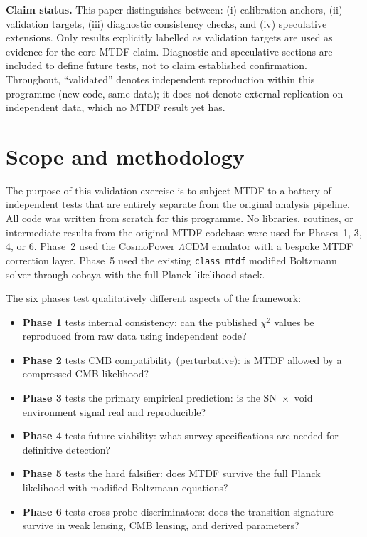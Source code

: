 \documentclass[11pt,a4paper]{article}
\begin{document}
\tableofcontents

\begin{mdframed}[linecolor=accent,linewidth=0.5pt,backgroundcolor=callout-bg,leftline=true,rightline=true,topline=true,bottomline=true,innerleftmargin=8pt,innerrightmargin=8pt,innertopmargin=6pt,innerbottommargin=6pt]
\textbf{Claim status.}
This paper distinguishes between:
(i) calibration anchors,
(ii) validation targets,
(iii) diagnostic consistency checks, and
(iv) speculative extensions.
Only results explicitly labelled as validation targets are used as evidence for the core MTDF claim. Diagnostic and speculative sections are included to define future tests, not to claim established confirmation. Throughout, ``validated'' denotes independent reproduction within this programme (new code, same data); it does not denote external replication on independent data, which no MTDF result yet has.
\end{mdframed}

\section{Scope and methodology}
\label{sec:sec1}
The purpose of this validation exercise is to subject MTDF to a battery of independent tests that are entirely separate from the original analysis pipeline. All code was written from scratch for this programme. No libraries, routines, or intermediate results from the original MTDF codebase were used for Phases~1, 3, 4, or 6. Phase~2 used the CosmoPower $\Lambda$CDM emulator with a bespoke MTDF correction layer. Phase~5 used the existing \texttt{class\_\allowbreak{}mtdf} modified Boltzmann solver through cobaya with the full Planck likelihood stack.

The six phases test qualitatively different aspects of the framework:

\begin{itemize}
  \item \textbf{Phase 1} tests internal consistency: can the published $\chi$$^{2}$ values be reproduced from raw data using independent code?
  \item \textbf{Phase 2} tests CMB compatibility (perturbative): is MTDF allowed by a compressed CMB likelihood?
  \item \textbf{Phase 3} tests the primary empirical prediction: is the SN~$\times$~void environment signal real and reproducible?
  \item \textbf{Phase 4} tests future viability: what survey specifications are needed for definitive detection?
  \item \textbf{Phase 5} tests the hard falsifier: does MTDF survive the full Planck likelihood with modified Boltzmann equations?
  \item \textbf{Phase 6} tests cross-probe discriminators: does the transition signature survive in weak lensing, CMB lensing, and derived parameters?
\end{itemize}
\end{document}
